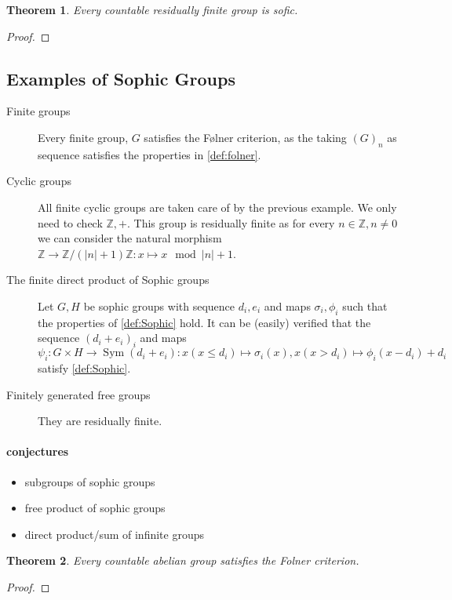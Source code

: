 \documentclass[a4paper]{report}
\newcommand{\Z}{\mathbb{Z}}
\DeclareMathOperator{\sym}{Sym}
\newtheorem{theorem}{Theorem}
\begin{document}
    \begin{theorem}
        Every countable residually finite group is sofic.
    \end{theorem}
    \begin{proof}
        
    \end{proof}

    \subsection{Examples of Sophic Groups}
    \begin{description}
        \item[Finite groups] Every finite group, $G$ satisfies the Følner criterion, as the taking $(G)_n$ as sequence satisfies the properties in \cref{def:folner}.
        \item[Cyclic groups] All finite cyclic groups are taken care of by the previous example. We only need to check $\Z,+$. This group is residually finite as for every $n \in \Z, n \ne 0$ we can consider the natural morphism $\Z \to \Z /(|n|+1)\Z: x \mapsto x \mod |n|+1$. 
        \item[The finite direct product of Sophic groups] Let $G, H$ be sophic groups with sequence $d_i, e_i$ and maps $\sigma_i, \phi_i$ such that the properties of \cref{def:Sophic} hold. It can be (easily) verified that the sequence $(d_i + e_i)_i$ and maps $\psi_i: G \times H \to \sym(d_i + e_i): x (x \le d_i) \mapsto \sigma_i(x), x (x > d_i) \mapsto \phi_i(x -d_i) + d_i$ satisfy \cref{def:Sophic}.
        \item[Finitely generated free groups] They are residually finite.
    \end{description}
    \paragraph{conjectures}
    \begin{itemize}
        \item subgroups of sophic groups
        \item free product of sophic groups
        \item direct product/sum of infinite groups
    \end{itemize}

    \begin{theorem}\label{thm:countable_abelian_folner}
        Every countable abelian group satisfies the Folner criterion. 
    \end{theorem}
    \begin{proof}
        
    \end{proof}
\end{document}
